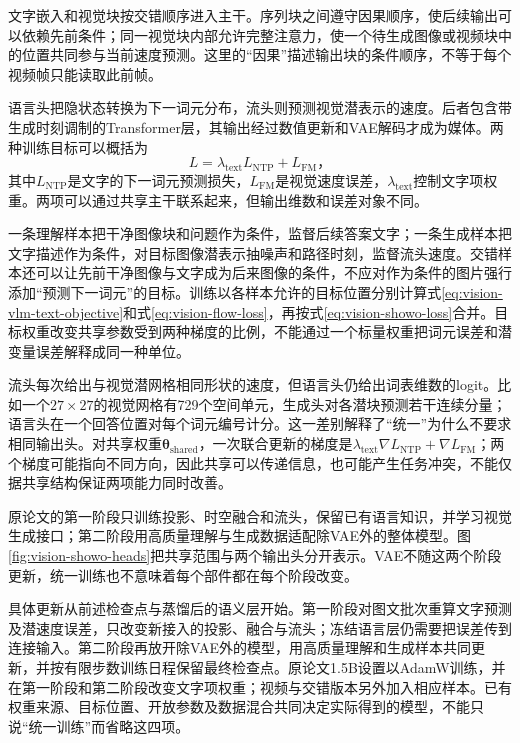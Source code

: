 文字嵌入和视觉块按交错顺序进入主干。序列块之间遵守因果顺序，使后续输出可以依赖先前条件；同一视觉块内部允许完整注意力，使一个待生成图像或视频块中的位置共同参与当前速度预测。这里的“因果”描述输出块的条件顺序，不等于每个视频帧只能读取此前帧。

语言头把隐状态转换为下一词元分布，流头则预测视觉潜表示的速度。后者包含带生成时刻调制的Transformer层，其输出经过数值更新和VAE解码才成为媒体。两种训练目标可以概括为
\begin{equation}
  L=\lambda_{\mathrm{text}}L_{\mathrm{NTP}}+L_{\mathrm{FM}}\text{，}
  \label{eq:vision-showo-loss}
\end{equation}
其中$L_{\mathrm{NTP}}$是文字的下一词元预测损失，$L_{\mathrm{FM}}$是视觉速度误差，$\lambda_{\mathrm{text}}$控制文字项权重。两项可以通过共享主干联系起来，但输出维数和误差对象不同。

一条理解样本把干净图像块和问题作为条件，监督后续答案文字；一条生成样本把文字描述作为条件，对目标图像潜表示抽噪声和路径时刻，监督流头速度。交错样本还可以让先前干净图像与文字成为后来图像的条件，不应对作为条件的图片强行添加“预测下一词元”的目标。训练以各样本允许的目标位置分别计算式\eqref{eq:vision-vlm-text-objective}和式\eqref{eq:vision-flow-loss}，再按式\eqref{eq:vision-showo-loss}合并。目标权重改变共享参数受到两种梯度的比例，不能通过一个标量权重把词元误差和潜变量误差解释成同一种单位。

流头每次给出与视觉潜网格相同形状的速度，但语言头仍给出词表维数的logit。比如一个$27\times27$的视觉网格有729个空间单元，生成头对各潜块预测若干连续分量；语言头在一个回答位置对每个词元编号计分。这一差别解释了“统一”为什么不要求相同输出头。对共享权重$\bm\theta_{\mathrm{shared}}$，一次联合更新的梯度是$\lambda_{\mathrm{text}}\nabla L_{\mathrm{NTP}}+\nabla L_{\mathrm{FM}}$；两个梯度可能指向不同方向，因此共享可以传递信息，也可能产生任务冲突，不能仅据共享结构保证两项能力同时改善。

原论文的第一阶段只训练投影、时空融合和流头，保留已有语言知识，并学习视觉生成接口；第二阶段用高质量理解与生成数据适配除VAE外的整体模型。图\ref{fig:vision-showo-heads}把共享范围与两个输出头分开表示。VAE不随这两个阶段更新，统一训练也不意味着每个部件都在每个阶段改变。

具体更新从前述检查点与蒸馏后的语义层开始。第一阶段对图文批次重算文字预测及潜速度误差，只改变新接入的投影、融合与流头；冻结语言层仍需要把误差传到连接输入。第二阶段再放开除VAE外的模型，用高质量理解和生成样本共同更新，并按有限步数训练日程保留最终检查点。原论文1.5B设置以AdamW训练，并在第一阶段和第二阶段改变文字项权重；视频与交错版本另外加入相应样本。已有权重来源、目标位置、开放参数及数据混合共同决定实际得到的模型，不能只说“统一训练”而省略这四项。

